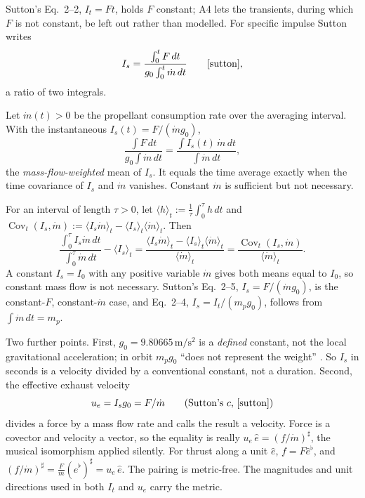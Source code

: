 Sutton's Eq.~2--2, $I_t=Ft$, holds $F$ constant; A4 lets the transients,
during which $F$ is not constant, be left out rather than modelled. For
specific impulse Sutton writes
\[
 I_s=\frac{\int_0^t F\,dt}{g_0\int_0^t\dot m\,dt}
 \qquad\text{\cite[Eq.~2--3]{sutton}},
\]
a ratio of two integrals.

\begin{proposition}\label{prop:weighted-mean}
Let $\dot m(t)>0$ be the propellant consumption rate over the averaging
interval. With the instantaneous $I_s(t)=F/(\dot m g_0)$,
\[
 \frac{\int F\,dt}{g_0\int\dot m\,dt}
 =\frac{\int I_s(t)\,\dot m\,dt}{\int \dot m\,dt},
\]
the \emph{mass-flow-weighted} mean of $I_s$. It equals the time average
exactly when the time covariance of $I_s$ and $\dot m$ vanishes. Constant
$\dot m$ is sufficient but not necessary.
\end{proposition}

\noindent For an interval of length $\tau>0$, let
$\langle h\rangle_t:=\frac1\tau\int_0^\tau h\,dt$ and
$\operatorname{Cov}_t(I_s,\dot m)
:=\langle I_s\dot m\rangle_t-\langle I_s\rangle_t\langle\dot m\rangle_t$. Then
\begin{equation}\label{Eq:SpecificImpulseMeanDifference}
 \frac{\int_0^\tau I_s\dot m\,dt}{\int_0^\tau\dot m\,dt}
      -\langle I_s\rangle_t
  =\frac{\langle I_s\dot m\rangle_t
          -\langle I_s\rangle_t\langle\dot m\rangle_t}
         {\langle\dot m\rangle_t}
   =\frac{\operatorname{Cov}_t(I_s,\dot m)}{\langle\dot m\rangle_t}.
\end{equation}
A constant $I_s=I_0$ with any positive variable $\dot m$ gives both means
equal to $I_0$, so constant mass flow is not necessary. Sutton's Eq.~2--5,
$I_s=F/(\dot m g_0)$, is the constant-$F$, constant-$\dot m$ case, and
Eq.~2--4, $I_s=I_t/(m_pg_0)$, follows from $\int\dot m\,dt=m_p$.

Two further points. First, $g_0=9.80665\,\mathrm{m/s^2}$ is a
\emph{defined} constant, not the local gravitational acceleration; in orbit
$m_pg_0$ ``does not represent the weight'' \cite[Section 2.1]{sutton}. So
$I_s$ in seconds is a velocity divided by a conventional constant, not a
duration. Second, the effective exhaust velocity
\[
 u_e=I_sg_0=F/\dot m \qquad\text{(Sutton's $c$, \cite[Eq.~2--6]{sutton})}
\]
divides a force by a mass flow rate and calls the result a velocity. Force
is a covector and velocity a vector, so the equality is really
$u_e\,\hat e=(f/\dot m)^\sharp$, the musical isomorphism applied silently. For
thrust along a unit $\hat e$, $f=F\hat e^\flat$, and
$(f/\dot m)^\sharp=\frac{F}{\dot m}(\hat e^\flat)^\sharp=u_e\,\hat e$.
The pairing is metric-free. The magnitudes and unit directions used in both
$I_t$ and $u_e$ carry the metric.

